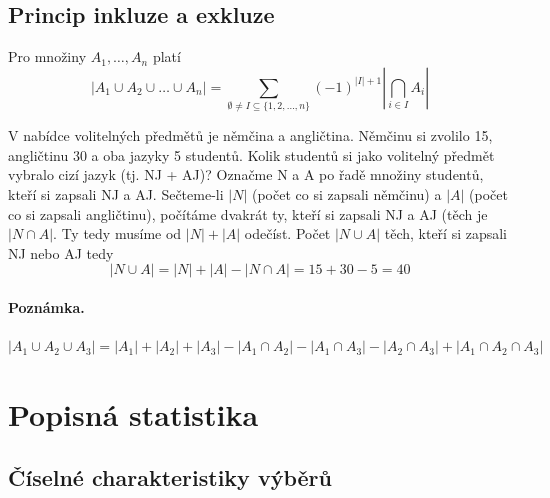 \subsection{Princip inkluze a exkluze}
\begin{sentence}
	Pro množiny $A_1, \dots, A_n$ platí $$|A_1 \cup A_2 \cup \dots \cup A_n| = \sum\limits_{\emptyset \neq I \subseteq \{1, 2, \dots , n \}} (-1)^{|I| + 1} |\bigcap_{i \in I} A_i |$$
\end{sentence}
\begin{example}
	V nabídce volitelných předmětů je němčina a angličtina. Němčinu si zvolilo 15, angličtinu 30 a oba jazyky 5 studentů. Kolik studentů si jako volitelný předmět vybralo cizí jazyk (tj. NJ + AJ)? Označme N a A po řadě množiny studentů, kteří si zapsali NJ a AJ. Sečteme-li $|N|$ (počet co si zapsali němčinu) a $|A|$ (počet co si zapsali angličtinu), počítáme dvakrát ty, kteří si zapsali NJ a AJ (těch je $|N \cap A|$. Ty tedy musíme od $|N| + |A|$ odečíst. Počet $|N \cup A|$ těch, kteří si zapsali NJ nebo AJ tedy $$|N \cup A| = |N| + |A| - |N \cap A| = 15 + 30 - 5 = 40$$
\end{example}
\paragraph{Poznámka.} $|A_1 \cup A_2 \cup A_3| = |A_1| + |A_2| + |A_3| - |A_1 \cap A_2| - |A_1 \cap A_3| - |A_2 \cap A_3| + |A_1 \cap A_2 \cap A_3|$

\section{Popisná statistika}
\subsection{Číselné charakteristiky výběrů}
